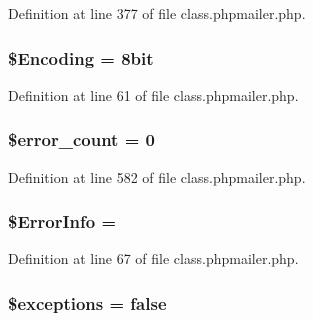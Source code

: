 Definition at line 377 of file class.\+phpmailer.\+php.

\subsubsection[{\texorpdfstring{\$\+Encoding}{$Encoding}}]{\setlength{\rightskip}{0pt plus 5cm}\$Encoding = \textquotesingle{}8bit\textquotesingle{}}\hypertarget{class_p_h_p_mailer_a7c44f20127f1436e9315b5fcfee472f3}{}\label{class_p_h_p_mailer_a7c44f20127f1436e9315b5fcfee472f3}


Definition at line 61 of file class.\+phpmailer.\+php.

\subsubsection[{\texorpdfstring{\$error\+\_\+count}{$error_count}}]{\setlength{\rightskip}{0pt plus 5cm}\$error\+\_\+count = 0\hspace{0.3cm}{\ttfamily [protected]}}\hypertarget{class_p_h_p_mailer_a7cdeffef92c4734cc7f303a7bea0711d}{}\label{class_p_h_p_mailer_a7cdeffef92c4734cc7f303a7bea0711d}


Definition at line 582 of file class.\+phpmailer.\+php.

\subsubsection[{\texorpdfstring{\$\+Error\+Info}{$ErrorInfo}}]{\setlength{\rightskip}{0pt plus 5cm}\$Error\+Info = \textquotesingle{}\textquotesingle{}}\hypertarget{class_p_h_p_mailer_a4aa7f2e8bf834210cc4522666115e03e}{}\label{class_p_h_p_mailer_a4aa7f2e8bf834210cc4522666115e03e}


Definition at line 67 of file class.\+phpmailer.\+php.

\subsubsection[{\texorpdfstring{\$exceptions}{$exceptions}}]{\setlength{\rightskip}{0pt plus 5cm}\$exceptions = false\hspace{0.3cm}{\ttfamily [protected]}}\hypertarget{class_p_h_p_mailer_a7b3cdaf64a0a391d40bc8ecd4008218a}{}\label{class_p_h_p_mailer_a7b3cdaf64a0a391d40bc8ecd4008218a}


